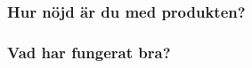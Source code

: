 \documentclass[a4paper]{article}
\begin{document}
\subsubsection{Hur nöjd är du med produkten?}



\subsubsection{Vad har fungerat bra?}


\end{document}
